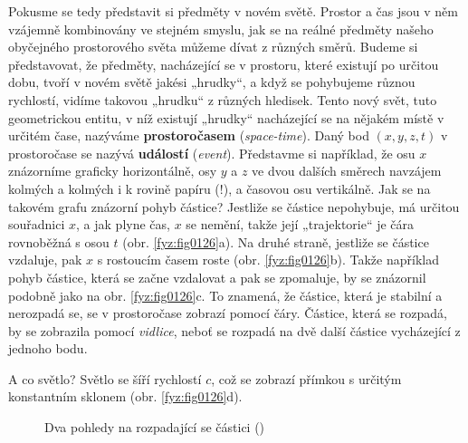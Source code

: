    Pokusme se tedy představit si předměty v novém světě. Prostor a čas jsou v něm vzájemně 
    kombinovány ve stejném smyslu, jak se na reálné předměty našeho obyčejného prostorového světa 
    můžeme dívat z různých směrů. Budeme si představovat, že předměty, nacházející se v prostoru, 
    které existují po určitou dobu, tvoří v novém světě jakési „hrudky“, a když se pohybujeme 
    různou rychlostí, vidíme takovou „hrudku“ z různých hledisek. Tento nový svět, tuto 
    geometrickou entitu, v níž existují „hrudky“ nacházející se na nějakém místě v určitém čase, 
    nazýváme \textbf{prostoročasem} (\emph{space-time}). Daný bod \((x, y, z, t)\) v prostoročase 
    se nazývá \textbf{událostí} (\emph{event}). Představme si například, že osu \(x\) znázorníme 
    graficky horizontálně, osy \(y\) a \(z\) ve dvou dalších směrech navzájem kolmých a kolmých i k 
    rovině papíru (!), a časovou osu vertikálně. Jak se na takovém grafu znázorní pohyb částice? 
    Jestliže se částice nepohybuje, má určitou souřadnici \(x\), a jak plyne čas, \(x\) se nemění, 
    takže její „trajektorie“ je čára rovnoběžná s osou \(t\) (obr. \ref{fyz:fig0126}a). Na druhé 
    straně, jestliže se částice vzdaluje, pak \(x\) s rostoucím časem roste (obr. 
    \ref{fyz:fig0126}b). Takže například pohyb částice, která se začne vzdalovat a pak se zpomaluje, 
    by se znázornil podobně jako na obr. \ref{fyz:fig0126}c. To znamená, že částice, která je 
    stabilní a nerozpadá se, se v prostoročase zobrazí pomocí čáry. Částice, která se rozpadá, by 
    se zobrazila pomocí \emph{vidlice}, neboť se rozpadá na dvě další částice vycházející z jednoho 
    bodu.
    
    A co světlo? Světlo se šíří rychlostí \(c\), což se zobrazí přímkou s určitým konstantním 
    sklonem (obr. \ref{fyz:fig0126}d).
    
    \begin{figure}[ht!]  %
      \centering
      \caption{Dva pohledy na rozpadající se částici (\cite[s.~239]{Feynman01})}
      \label{fyz:fig0127}
    \end{figure}
    

